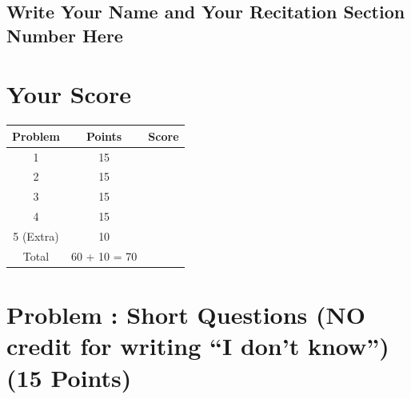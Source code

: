 \documentclass[12pt]{amsart}
\newcounter{pNum}
\newcommand{\problem}[2]{\addtocounter{pNum}{1}
\section*{Problem \arabic{pNum}: #1 (#2 Points)}}
\begin{document}
\vfill


\begin{framed}
\vspace{-0.3cm}
\section*{Write Your Name and Your Recitation Section Number Here}
\begin{center}{\hspace{2cm}} \end{center}
\vspace{1cm}
\end{framed}
\vfill

\newpage

\vfill

\hspace{0cm}

\vfill

\section*{Your Score}

\vfill

\begin{center}
\begin{tabular}{|c|c|c|}
\hline
Problem &
Points &
Score \\ \hline
1 & 15 & \\ \hline
2 & 15 & \\ \hline
3 & 15 & \\ \hline
4 & 15 & \\ \hline
5 (Extra) & 10 & \\ \hline
Total & 60 + 10 = 70 & \\
\hline
\end{tabular}
\end{center}

\vfill

\hspace{0cm}

\vfill

\newpage

\newpage


\problem{Short Questions (NO credit for writing ``I don't know'')}{15}
\end{document}
